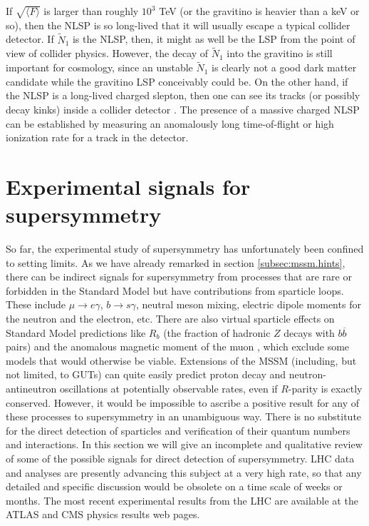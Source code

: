 \documentclass[11pt]{article}
\def\stilde{\widetilde}
\def\NI{\stilde N_1}
\begin{document}
If $\sqrt{\langle F \rangle}$ is larger than roughly $10^3$ TeV (or the 
gravitino is heavier than a keV or so), then the NLSP is so long-lived 
that it will usually escape a typical collider detector. If $\NI$ is the 
NLSP, then, it might as well be the LSP from the point of view of collider 
physics. However, the decay of $\NI$ into the gravitino is still important 
for cosmology, since an unstable $\NI$ is clearly not a good dark matter 
candidate while the gravitino LSP conceivably could be. On the other hand, 
if the NLSP is a long-lived charged slepton, then one can see its tracks 
(or possibly decay kinks) inside a collider detector \cite{DDRT}. The 
presence of a massive charged NLSP can be established by measuring an 
anomalously long time-of-flight or high ionization rate for a track in the 
detector.

\section{Experimental signals for supersymmetry}\label{sec:signals}
\setcounter{equation}{0}
\setcounter{figure}{0}
\setcounter{table}{0}
\setcounter{footnote}{1}

So far, the experimental study of supersymmetry has unfortunately been 
confined to setting limits. As we have already remarked in section 
\ref{subsec:mssm.hints}, there can be indirect signals for supersymmetry 
from processes that are rare or forbidden in the Standard Model but have 
contributions from sparticle loops. These include $\mu\rightarrow 
e\gamma$, $b\rightarrow s\gamma$, neutral meson mixing, electric dipole 
moments for the neutron and the electron, etc. There are also virtual 
sparticle effects on Standard Model predictions like $R_b$ (the fraction 
of hadronic $Z$ decays with $b\overline b$ pairs) \cite{Rb} and the 
anomalous magnetic moment of the muon \cite{muonmoment}, which 
exclude some models that would otherwise be viable. 
Extensions of the MSSM (including, but not limited, to GUTs) 
can quite easily predict proton decay and neutron-antineutron 
oscillations at potentially observable rates, even if $R$-parity is exactly 
conserved. However, it would be impossible to ascribe a positive result 
for any of these processes to supersymmetry in an unambiguous way. There 
is no substitute for the direct detection of sparticles and verification 
of their quantum numbers and interactions. In this section we will give an 
incomplete and qualitative review of some of the possible signals for 
direct detection of supersymmetry. LHC data and analyses 
are presently advancing this subject at a very high rate, so that any detailed and specific discussion would be obsolete on a time scale of weeks or months. The most recent
experimental results from the LHC are available at the 
ATLAS and CMS physics results web pages.
\end{document}
